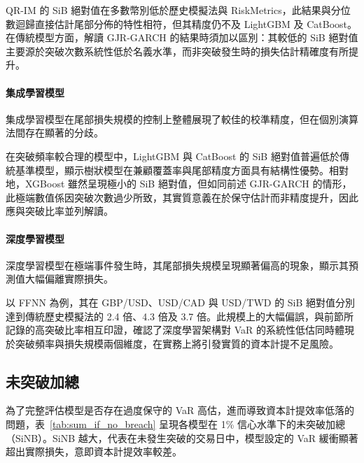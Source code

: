 QR-IM 的 SiB 絕對值在多數幣別低於歷史模擬法與 RiskMetrics，此結果與分位數迴歸直接估計尾部分佈的特性相符，但其精度仍不及 LightGBM 及 CatBoost。在傳統模型方面，解讀 GJR-GARCH 的結果時須加以區別：其較低的 SiB 絕對值主要源於突破次數系統性低於名義水準，而非突破發生時的損失估計精確度有所提升。

\paragraph{集成學習模型}

集成學習模型在尾部損失規模的控制上整體展現了較佳的校準精度，但在個別演算法間存在顯著的分歧。

在突破頻率較合理的模型中，LightGBM 與 CatBoost 的 SiB 絕對值普遍低於傳統基準模型，顯示樹狀模型在兼顧覆蓋率與尾部精度方面具有結構性優勢。相對地，XGBoost 雖然呈現極小的 SiB 絕對值，但如同前述 GJR-GARCH 的情形，此極端數值係因突破次數過少所致，其實質意義在於保守估計而非精度提升，因此應與突破比率並列解讀。

\paragraph{深度學習模型}

深度學習模型在極端事件發生時，其尾部損失規模呈現顯著偏高的現象，顯示其預測值大幅偏離實際損失。

以 FFNN 為例，其在 GBP/USD、USD/CAD 與 USD/TWD 的 SiB 絕對值分別達到傳統歷史模擬法的 2.4 倍、4.3 倍及 3.7 倍。此規模上的大幅偏誤，與前節所記錄的高突破比率相互印證，確認了深度學習架構對 VaR 的系統性低估同時體現於突破頻率與損失規模兩個維度，在實務上將引發實質的資本計提不足風險。

\subsection{未突破加總}
\label{sec:perf_sumifnobreach}

為了完整評估模型是否存在過度保守的 VaR 高估，進而導致資本計提效率低落的問題，表~\ref{tab:sum_if_no_breach} 呈現各模型在 1\% 信心水準下的未突破加總（SiNB）。SiNB 越大，代表在未發生突破的交易日中，模型設定的 VaR 緩衝顯著超出實際損失，意即資本計提效率較差。

